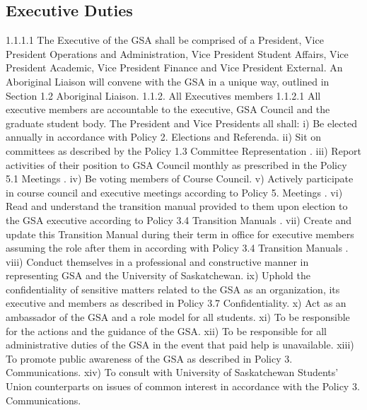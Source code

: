 \subsection{Executive Duties} 
1.1.1.1 The Executive of the GSA shall be comprised of a President, Vice President Operations and Administration, Vice President Student Affairs, Vice President Academic, Vice President Finance and Vice President External. An Aboriginal Liaison will convene with the GSA in a unique way, outlined in Section 1.2 Aboriginal Liaison. 
1.1.2. All Executives members 1.1.2.1 All executive members are accountable to the executive, GSA Council and the graduate student body. The President and Vice Presidents all shall: i) Be elected annually in accordance with Policy 2. Elections and Referenda. ii) Sit on committees as described by the Policy 1.3 Committee Representation . iii) Report activities of their position to GSA Council monthly as prescribed in the Policy 5.1 Meetings . iv) Be voting members of Course Council. v) Actively participate in course council and executive meetings according to Policy 5. Meetings . vi) Read and understand the transition manual provided to them upon election to the GSA executive according to Policy 3.4 Transition Manuals . vii) Create and update this Transition Manual during their term in office for executive members assuming the role after them in according with Policy 3.4 Transition Manuals . 
viii) Conduct themselves in a professional and constructive manner in representing GSA and the University of Saskatchewan. 
ix) Uphold the confidentiality of sensitive matters related to the GSA as an organization, its executive and members as described in Policy 3.7 Confidentiality.
x) Act as an ambassador of the GSA and a role model for all students. xi) To be responsible for the actions and the guidance of the GSA. 
xii) To be responsible for all administrative duties of the GSA in the event that paid help is unavailable. 
xiii) To promote public awareness of the GSA as described in Policy 3. Communications. 
xiv) To consult with University of Saskatchewan Students’ Union counterparts on issues of common interest in accordance with the Policy 3. Communications. 
